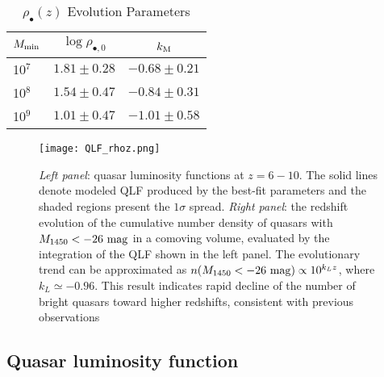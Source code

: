 \documentclass[twocolumn, twocolappendix]{aastex63}
\newcommand{\Muv}{M_{1450}}
\begin{document}
\begin{CJK*}{UTF8}{gbsn}
\begin{table}
\renewcommand\thetable{1} %
\caption{$\rho_\bullet(z)$ Evolution Parameters}
\begin{center}
\begin{tabular}{l c r}
\hline
\hline
$M_{\rm min}$ & $\log \rho_{\bullet,0}$ & $k_{\rm M}$ ~~~ \\ 
\hline 
10$^7$  &  $ 1.81\pm 0.28$  &  $-0.68 \pm 0.21$  \\
10$^8$  &  $ 1.54\pm 0.47$  &  $-0.84 \pm 0.31$  \\
10$^9$  &  $ 1.01\pm 0.47$  &  $-1.01 \pm 0.58$ \\
\hline 
\end{tabular}
\label{tab:MFz}
\end{center}
\end{table}    


\begin{figure*}
\centering
\texttt{[image: QLF\_rhoz.png]}
\caption{
{\it Left panel}: quasar luminosity functions at $z=6-10$. 
The solid lines denote modeled QLF produced by the best-fit parameters and the shaded regions present the $1\sigma$ spread. 
{\it Right panel}: the redshift evolution of the cumulative number density of quasars with $\Muv <-26~{\rm mag}$ in a comoving volume,
evaluated by the integration of the QLF shown in the left panel.
The evolutionary trend can be approximated as $n(\Muv<-26~{\rm mag})\propto 10^{k_{L} z}$, where $k_L \simeq -0.96$.
This result indicates rapid decline of the number of bright quasars toward higher redshifts, consistent with previous observations
\citep[red data points; see][]{2016ApJ...833..222J, 2019ApJ...884...30W}
}
\label{fig:QLF_rhoz}
\vspace{5mm}
\end{figure*}


\subsection{Quasar luminosity function}


\end{CJK*}
\end{document}
